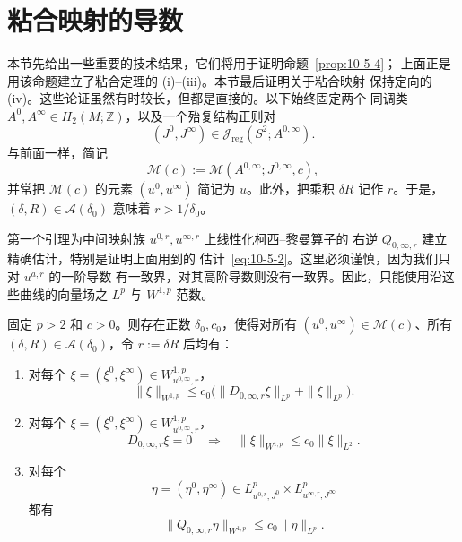 
\section{粘合映射的导数}\label{sec:10-6}

本节先给出一些重要的技术结果，它们将用于证明命题~\ref{prop:10-5-4}；
上面正是用该命题建立了粘合定理的 (i)--(iii)。本节最后证明关于粘合映射
保持定向的 (iv)。这些论证虽然有时较长，但都是直接的。以下始终固定两个
同调类 $A^0,A^\infty\in H_2(M;\mathbb Z)$，以及一个殆复结构正则对
\[
  (J^0,J^\infty)\in
  \mathcal J_{\mathrm{reg}}(S^2;A^{0,\infty}).
\]
与前面一样，简记
\[
  \mathcal M(c):=\mathcal M(A^{0,\infty};J^{0,\infty},c),
\]
并常把 $\mathcal M(c)$ 的元素 $(u^0,u^\infty)$ 简记为 $u$。此外，把乘积
$\delta R$ 记作 $r$。于是，$(\delta,R)\in\mathcal A(\delta_0)$ 意味着
$r>1/\delta_0$。

第一个引理为中间映射族 $u^{0,r},u^{\infty,r}$ 上线性化柯西--黎曼算子的
右逆 $Q_{0,\infty,r}$ 建立精确估计，特别是证明上面用到的
估计~\eqref{eq:10-5-2}。这里必须谨慎，因为我们只对 $u^{a,r}$ 的一阶导数
有一致界，对其高阶导数则没有一致界。因此，只能使用沿这些曲线的向量场之
$L^p$ 与 $W^{1,p}$ 范数。

\begin{lemma}\label{lem:10-6-1}
固定 $p>2$ 和 $c>0$。则存在正数 $\delta_0,c_0$，使得对所有
$(u^0,u^\infty)\in\mathcal M(c)$、所有
$(\delta,R)\in\mathcal A(\delta_0)$，令 $r:=\delta R$ 后均有：

\begin{enumerate}[label=(\roman*)]
\item 对每个
$\xi=(\xi^0,\xi^\infty)\in W_{u^{0,\infty},r}^{1,p}$，
\[
  \|\xi\|_{W^{1,p}}
  \le c_0\bigl(\|D_{0,\infty,r}\xi\|_{L^p}
                 +\|\xi\|_{L^p}\bigr).
\]

\item 对每个
$\xi=(\xi^0,\xi^\infty)\in W_{u^{0,\infty},r}^{1,p}$，
\[
  D_{0,\infty,r}\xi=0
  \quad\Longrightarrow\quad
  \|\xi\|_{W^{1,p}}\le c_0\|\xi\|_{L^2}.
\]

\item 对每个
\[
  \eta=(\eta^0,\eta^\infty)
  \in L_{u^{0,r},J^0}^p\times L_{u^{\infty,r},J^\infty}^p
\]
都有
\[
  \|Q_{0,\infty,r}\eta\|_{W^{1,p}}
  \le c_0\|\eta\|_{L^p}.
\]
\end{enumerate}
\end{lemma}

